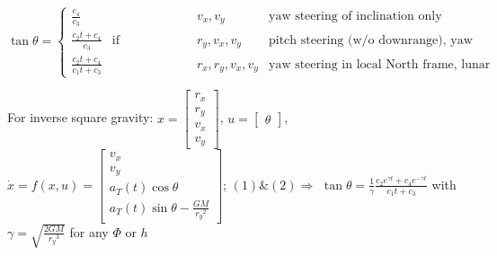 \documentclass[11pt,landscape]{article}
\begin{document}
$
\tan\theta = \left\{
\begin{matrix}
\frac{c_4}{c_3} & & v_x, v_y &
  \text{yaw steering of inclination only} \\
\frac{c_2 t + c_4}{c_3} & \text{if constraining} & r_y, v_x, v_y &
  \text{pitch steering (w/o downrange), yaw steering in insertion plane} \\
\frac{c_2 t + c_4}{c_1 t + c_3} & & r_x, r_y, v_x, v_y &
  \text{yaw steering in local North frame, lunar landing}
\end{matrix}
\right.
$

For inverse square gravity:
$x = \begin{bmatrix} r_x \\ r_y \\ v_x \\ v_y \end{bmatrix}$,
$u = \begin{bmatrix} \theta \end{bmatrix}$,
$\dot{x} = f(x, u) = 
\begin{bmatrix} v_x \\ v_y \\ a_T(t)\cos\theta \\ 
a_T(t)\sin\theta - \frac{GM}{{r_y}^2} \end{bmatrix}$;
$(1) \& (2) \Rightarrow$
$\tan\theta = \frac{1}{\gamma}\frac{c_2 e^{\gamma t}+c_4 e^{-\gamma t}}{c_1 t + c_3}$
with $\gamma = \sqrt{\frac{2GM}{{r_y}^3}}$ 
for any $\Phi$ or $h$


\scriptsize


\end{document}
